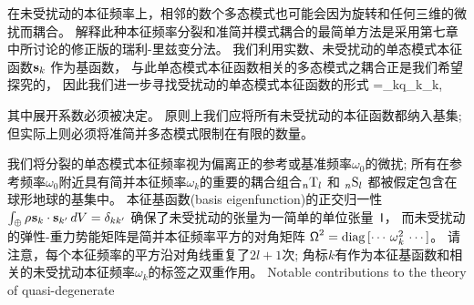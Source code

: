 {{在未受扰动的本征频率上，相邻的数个多态模式也可能会因为旋转和任何三维的微扰而耦合。
解释此种本征频率分裂和准简并模式耦合的最简单方法是采用第七章中所讨论的修正版的瑞利-里兹变分法。
我们利用实数、未受扰动的单态模式本征函数$\mbox{${\bf s}$}_k$
%
作为基函数，
与此单态模式本征函数相关的多态模式之耦合正是我们希望探究的，
因此我们进一步寻找受扰动的单态模式本征函数的形式
\eq \label{13.Rayexp}
\bs=\sum_kq_k\bs_k,
\en

其中展开系数必须被决定。
原则上我们应将所有未受扰动的本征函数都纳入基集;
但实际上则必须将准简并多态模式限制在有限的数量。

我们将分裂的单态模式本征频率视为偏离正的参考或基准频率$\omega_0$的微扰;
所有在参考频率$\omega_0$附近具有简并本征频率$\omega_k$的重要的耦合组合${}_n{\rm T}_l$
和 ${}_n{\rm S}_l$
都被假定包含在球形地球的基集中。
本征基函数(basis eigenfunction)的正交归一性$\int_{\subearth}\rho\hspace{0.2 mm}\bs_k\cdot\bs_{k'}\,dV=\delta_{kk'}$
确保了未受扰动的张量为一简单的单位张量~$\mbox{${\sf I}$}$，
而未受扰动的弹性-重力势能矩阵是简并本征频率平方的对角矩阵
$\mbox{${\sf \Omega}$}^2={\rm diag}\,[\cdots\,\mbox{$\omega$}_k^2\,\cdots]$。
请注意，每个本征频率的平方沿对角线重复了$2l+1$次;
角标$k$有作为本征基函数和相关的未受扰动本征频率$\omega_k$的标签之双重作用。
\iffalse
Notable contributions to the theory of quasi-degenerate
}}
